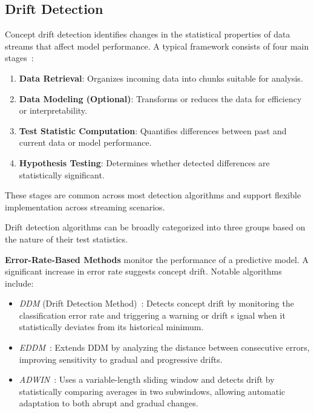 \subsection*{Drift Detection}\label{subsec:drift_detection}
Concept drift detection identifies changes in the statistical properties of
data streams that affect model performance. A typical framework consists of
four main stages~\cite{learning_under_concept_drift}:

\begin{enumerate}
    \item \textbf{Data Retrieval}: Organizes incoming data into chunks
          suitable for analysis.
    \item \textbf{Data Modeling (Optional)}: Transforms or reduces the data
          for efficiency or interpretability.
    \item \textbf{Test Statistic Computation}: Quantifies differences between
          past and current data or model performance.
    \item \textbf{Hypothesis Testing}: Determines whether detected differences
          are statistically significant.
\end{enumerate}

These stages are common across most detection algorithms and support flexible
implementation across streaming scenarios.

Drift detection algorithms can be broadly categorized into three groups based
on the nature of their test statistics.

\textbf{Error-Rate-Based Methods} monitor the performance of a predictive model.
A significant increase in error rate suggests concept drift.
Notable algorithms include:

\begin{itemize}
    \item \emph{DDM} (Drift Detection Method)~\cite{ddm}: Detects concept drift
          by monitoring the classification error rate and triggering a warning or drift s
          ignal when it statistically deviates from its historical minimum.

    \item \emph{EDDM}~\cite{eddm}: Extends DDM by analyzing the distance between
          consecutive errors, improving sensitivity to gradual and progressive drifts.

    \item \emph{ADWIN}~\cite{adwin}: Uses a variable-length sliding window and
          detects drift by statistically comparing averages in two subwindows, allowing
          automatic adaptation to both abrupt and gradual changes.
\end{itemize}

